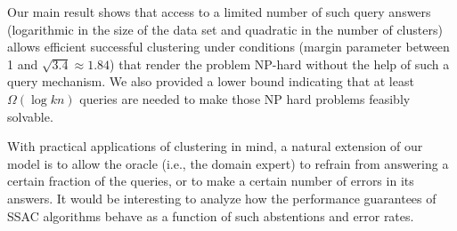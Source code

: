 \documentclass[12pt]{article}
\begin{document}
Our main result shows that access to a limited number of such query answers (logarithmic in the size of the data set and quadratic in the number of clusters) allows efficient successful clustering under conditions (margin parameter between 1 and $\sqrt{3.4} \approx 1.84$) that render the problem NP-hard without the help of such a query mechanism.  
 We also provided a lower bound indicating that at least $\Omega(\log kn)$ queries are needed to make those NP hard problems feasibly solvable.

With practical applications of clustering in mind, a natural extension of our model is to allow the oracle (i.e., the domain expert) to refrain from answering a certain fraction of the queries, or to make a certain number of errors in its answers. It would be interesting to analyze how the performance guarantees of SSAC algorithms behave as a function of such abstentions and error rates. 

\ifdefined\COMPLETE
\else
\end{document}
